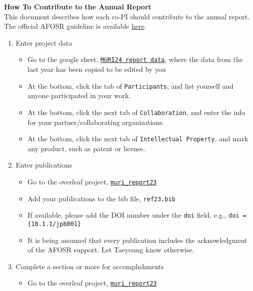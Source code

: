 \documentclass[letterpaper,11pt]{article}
\begin{document}
\selectfont
\thispagestyle{empty}
\noindent\textbf{\Large How To Contribute to the Annual Report}\\[0.3cm]

This document describes how each co-PI should contribute to the annual report. The official AFOSR guideline is available \href{https://afosr.gov1.qualtrics.com/CP/File.php?F=F_6z0CePSAlQtlzng}{here}. 

\begin{enumerate}
    \item Enter project data
        \begin{itemize}
            \item Go to the google sheet, \href{https://docs.google.com/spreadsheets/d/10obUfCgK5TLNYDSzH0GSxBX0Bv0RVghhWma4WrY66xU/edit?usp=sharing}{\texttt{MURI24 report data}}, where the data from the last year has been copied to be edited by you
            \item At the bottom, click the tab of \texttt{Participants}, and list yourself and anyone participated in your work. 
            \item At the bottom, click the next tab of \texttt{Collaboration}, and enter the info for your partner/collaborating organizations. 
            \item At the bottom, click the next tab of \texttt{Intellectual Property}, and mark any product, such as patent or license. 
        \end{itemize}
    \item Enter publications
        \begin{itemize}
            \item Go to the overleaf project, \href{https://www.overleaf.com/1586261996hchzjbrvfgmj#6d8639}{\texttt{muri\_report23}}
            \item Add your publications to the bib file,  \texttt{ref23.bib}
            \item If available, please add the DOI number under the \texttt{doi} field, e.g., \texttt{doi = \{10.1.1/jpb001\}}
            \item It is being assumed that every publication includes the acknowledgment of the AFOSR support. Let Taeyoung know otherwise.
        \end{itemize}
    \item Complete a section or more for accomplishments
        \begin{itemize}
            \item Go to the overleaf project, \href{https://www.overleaf.com/1586261996hchzjbrvfgmj#6d8639}{\texttt{muri\_report23}}

\end{itemize}
\end{enumerate}
\end{document}
